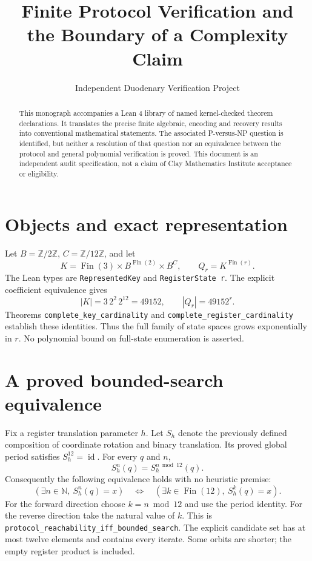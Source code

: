 \documentclass[11pt]{article}
\title{Finite Protocol Verification and the Boundary of a Complexity Claim}
\author{Independent Duodenary Verification Project}
\date{}
\begin{document}
\maketitle
\begin{abstract}
This monograph accompanies a Lean 4 library of \AuditedTheoremCount{} named
kernel-checked theorem declarations. It translates the precise finite algebraic,
encoding and recovery results into conventional mathematical statements. The
associated P-versus-NP question is identified, but neither a resolution of that
question nor an equivalence between the protocol and general polynomial
verification is proved. This document is an independent audit specification,
not a claim of Clay Mathematics Institute acceptance or eligibility.
\end{abstract}

\section{Objects and exact representation}
Let $B=\mathbb Z/2\mathbb Z$, $C=\mathbb Z/12\mathbb Z$, and let
\[
 K=\operatorname{Fin}(3)\times B^{\operatorname{Fin}(2)}
       \times B^C,\qquad Q_r=K^{\operatorname{Fin}(r)}.
\]
The Lean types are \texttt{RepresentedKey} and \texttt{RegisterState r}.
The explicit coefficient equivalence gives
\[
 |K|=3\,2^2\,2^{12}=49152,\qquad |Q_r|=49152^r.
\]
Theorems \texttt{complete\_key\_cardinality} and
\texttt{complete\_register\_cardinality} establish these identities.
Thus the full family of state spaces grows exponentially in $r$.
No polynomial bound on full-state enumeration is asserted.

\section{A proved bounded-search equivalence}
Fix a register translation parameter $h$. Let $S_h$ denote the previously
defined composition of coordinate rotation and binary translation. Its proved
global period satisfies $S_h^{12}=\operatorname{id}$. For every $q$ and $n$,
\[
 S_h^n(q)=S_h^{n\bmod 12}(q).
\]
Consequently the following equivalence holds with no heuristic premise:
\begin{equation}\label{eq:bounded}
 (\exists n\in\mathbb N,\ S_h^n(q)=x)
 \quad\Longleftrightarrow\quad
 (\exists k\in\operatorname{Fin}(12),\ S_h^k(q)=x).
\end{equation}
For the forward direction choose $k=n\bmod12$ and use the period identity.
For the reverse direction take the natural value of $k$.
This is \texttt{protocol\_reachability\_iff\_bounded\_search}.
The explicit candidate set has at most twelve elements and contains every
iterate. Some orbits are shorter; the empty register product is included.
\end{document}

